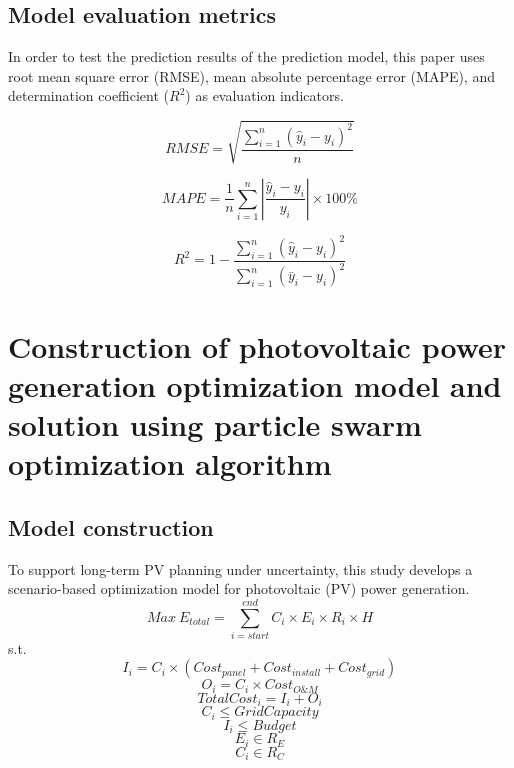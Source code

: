 \documentclass{article}
\begin{document}
	\subsection{Model evaluation metrics}
	In order to test the prediction results of the prediction model, this paper uses root mean square error (RMSE), mean absolute percentage error (MAPE), and determination coefficient ($R^2$) as evaluation indicators.
	
	\begin{equation}
		RMSE = \sqrt{\frac{\sum_{i=1}^{n} (\hat{y}_i - y_i)^2}{n}}
	\end{equation}
	
	\begin{equation}
		MAPE = \frac{1}{n} \sum_{i=1}^{n} \left|\frac{\hat{y}_i - y_i}{y_i}\right| \times 100\%
	\end{equation}
	
	\begin{equation}
		R^2 = 1 - \frac{\sum_{i=1}^{n} (\hat{y}_i - y_i)^2}{\sum_{i=1}^{n} (\bar{y}_i - y_i)^2}
	\end{equation}
	
	\section{Construction of photovoltaic power generation optimization model and solution using particle swarm optimization algorithm}
	\subsection{Model construction}
	To support long-term PV planning under uncertainty, this study develops a scenario-based optimization model for photovoltaic (PV) power generation.
	\begin{equation}
		Max~E_{total}=\sum_{i=start}^{end}C_{i}\times E_{i}\times R_{i}\times H
	\end{equation}
	s.t.
	\begin{equation}
		I_{i}=C_{i}\times(Cost_{panel}+Cost_{install}+Cost_{grid})
	\end{equation}
	\begin{equation}
		O_{i}=C_{i}\times Cost_{O\&M}
	\end{equation}
	\begin{equation}
		TotalCost_{i}=I_{i}+O_{i}
	\end{equation}
	\begin{equation}
		C_{i}\le GridCapacity
	\end{equation}
	\begin{equation}
		I_{i}\le Budget
	\end{equation}
	\begin{equation}
		E_{i}\in R_{E}
	\end{equation}
	\begin{equation}
		C_{i}\in R_{C}
	\end{equation}
	
\end{document}
